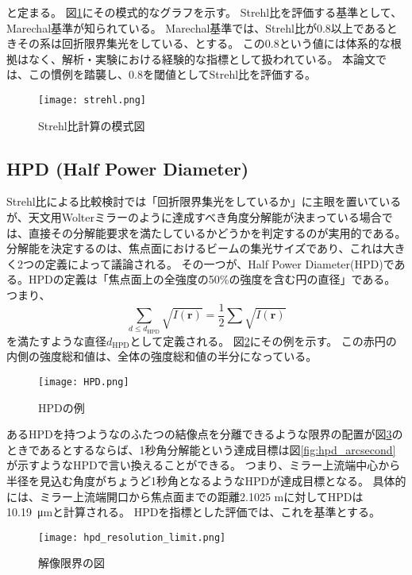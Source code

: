 と定まる。
図\ref{fig:strehl_explanation}にその模式的なグラフを示す。
Strehl比を評価する基準として、Marechal基準\cite{BornWolf:1999:Book}が知られている。
Marechal基準では、Strehl比が0.8以上であるときその系は回折限界集光をしている、とする。
この0.8という値には体系的な根拠はなく、解析・実験における経験的な指標として扱われている。
本論文では、この慣例を踏襲し、0.8を閾値としてStrehl比を評価する。

\begin{figure}[h]
\centering
\texttt{[image: strehl.png]}
\caption{Strehl比計算の模式図}
\label{fig:strehl_explanation}
\end{figure}

\subsection{HPD (Half Power Diameter)}
\label{chap2_hpd}

Strehl比による比較検討では「回折限界集光をしているか」に主眼を置いているが、天文用Wolterミラーのように達成すべき角度分解能が決まっている場合では、直接その分解能要求を満たしているかどうかを判定するのが実用的である。
分解能を決定するのは、焦点面におけるビームの集光サイズであり、これは大きく2つの定義によって議論される。
その一つが、Half Power Diameter(HPD)である。HPDの定義は「焦点面上の全強度の50\%の強度を含む円の直径」である。つまり、
\[
    \sum_{d\leq d_{\mathrm{HPD}}} \sqrt{ I(\mathbf{r}) } = \frac{1}{2} \sum \sqrt{ I(\mathbf{r}) }
\]
を満たすような直径$d_{\mathrm{HPD}}$として定義される。
図\ref{fig:hpd_explanation}にその例を示す。
この赤円の内側の強度総和値は、全体の強度総和値の半分になっている。

\begin{figure}[!ht]
\centering
\texttt{[image: HPD.png]}
\caption{HPDの例}
\label{fig:hpd_explanation}
\end{figure}

あるHPDを持つようなのふたつの結像点を分離できるような限界の配置が図\ref{fig:hpd_resolution_limit}のときであるとするならば、1秒角分解能という達成目標は図\ref{fig:hpd_arcsecond}が示すようなHPDで言い換えることができる。
つまり、ミラー上流端中心から半径を見込む角度がちょうど1秒角となるようなHPDが達成目標となる。
具体的には、ミラー上流端開口から焦点面までの距離2.1025 mに対してHPDは\SI{10.19}{\micro \metre}と計算される。
HPDを指標とした評価では、これを基準とする。

\begin{figure}[ht]
\centering
\texttt{[image: hpd\_resolution\_limit.png]}
\caption{解像限界の図}
\label{fig:hpd_resolution_limit}
\end{figure}

